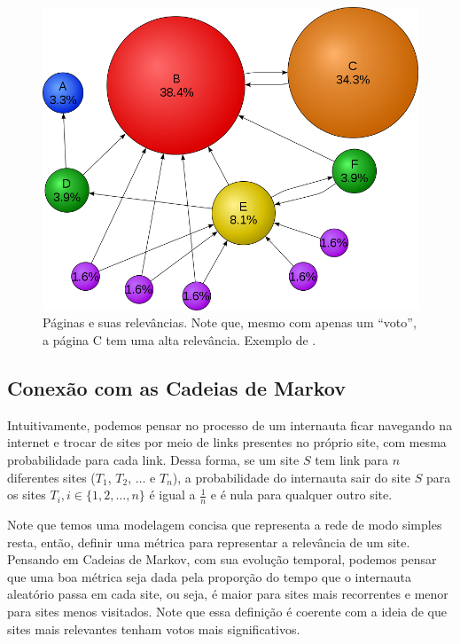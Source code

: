 \documentclass{article}
\begin{document}
\begin{figure}
    \centering
    \includegraphics[scale = 0.5]{PageRanks-Example.png}
    \caption{Páginas e suas relevâncias. Note que, mesmo com apenas um ``voto'', a página C tem uma alta relevância. Exemplo de \cite{wiki}.}
    \label{wiki_example}
\end{figure}

\subsection*{Conexão com as Cadeias de Markov}

Intuitivamente, podemos pensar no processo de um internauta ficar navegando na internet e trocar de sites por meio de links presentes no próprio site, com mesma probabilidade para cada link. Dessa forma, se um site $S$ tem link para $n$ diferentes sites ($T_1$, $T_2$, $\dots$ e $T_n$), a probabilidade do internauta sair do site $S$ para os sites $T_i, i \in \{1, 2, \dots, n\}$ é igual a $\frac{1}{n}$ e é nula para qualquer outro site.

Note que temos uma modelagem concisa que representa a rede de modo simples resta, então, definir uma métrica para representar a relevância de um site. Pensando em Cadeias de Markov, com sua evolução temporal, podemos pensar que uma boa métrica seja dada pela proporção do tempo que o internauta aleatório passa em cada site, ou seja, é maior para sites mais recorrentes e menor para sites menos visitados. Note que essa definição é coerente com a ideia de que sites mais relevantes tenham votos mais significativos.
\end{document}
